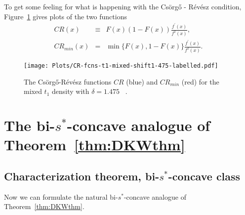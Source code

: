 \documentclass[11pt]{amsart}
\numberwithin{equation}{section}
\theoremstyle{definition}\newtheorem{definition}{Definition}
\theoremstyle{remark}\newtheorem{assumption}{Assumption}
\theoremstyle{remark}\newtheorem{remark}{Remark}
\theoremstyle{definition}\newtheorem{example}{Example}
\theoremstyle{plain}\newtheorem{question}{Question}
\theoremstyle{plain}\newtheorem{theorem}{Theorem}
\theoremstyle{plain}\newtheorem{lemma}{Lemma}
\theoremstyle{plain}\newtheorem{proposition}{Proposition}
\theoremstyle{plain}\newtheorem{corollary}{Corollary}
\theoremstyle{plain}\newtheorem{conjecture}{Conjecture}
\begin{document}
 To get some feeling for what is happening with the Cs\"org\H{o} - R\'ev\'esz condition, 
 Figure~\ref{fig:fig4Mixed} gives plots of  the two functions 
\begin{eqnarray*}
 CR(x) & \equiv & F(x) (1-F(x)) \frac{f^{\prime} (x)}{f^2 (x)} ,\\
 CR_{min} (x) & = & \min\{ F(x), 1-F(x) \} \frac{f^{\prime} (x)} {f^2 (x)} .
 \end{eqnarray*}

\begin{figure}[ht]
    \centering
    \texttt{[image: Plots/CR-fcns-t1-mixed-shift1-475-labelled.pdf]} 
    \caption{The Cs\"org\H{o}-R\'ev\'esz functions $CR$ (blue) and  $CR_{min}$ (red) 
    for the mixed $t_1$ density with $\delta = 1.475$ \ .}
     \label{fig:fig4Mixed}
 \end{figure}

 \FloatBarrier
\newpage

\section{The bi-$s^*$-concave analogue of Theorem~\ref{thm:DKWthm}}
\label{sec:Theorem1s}

\subsection{Characterization theorem, bi-$s^*$-concave class}
\label{subsec:CharThm}

Now we can formulate the natural bi-$s^*$-concave analogue of Theorem~\ref{thm:DKWthm}.
   
\end{document}
